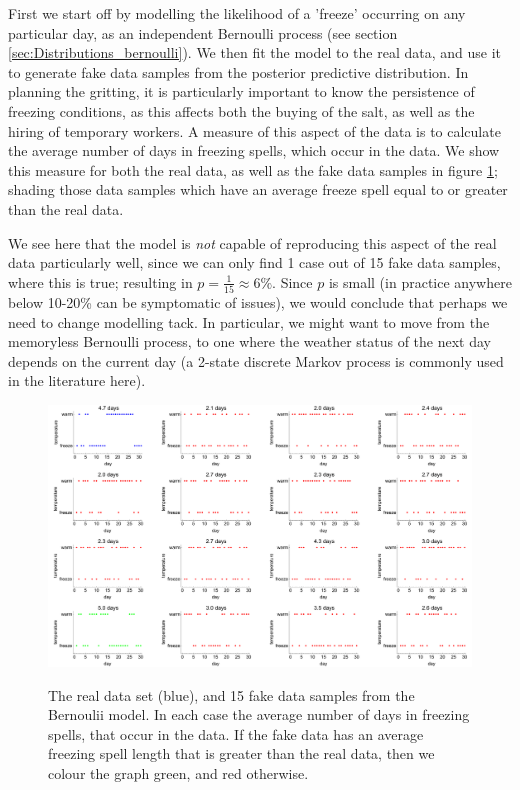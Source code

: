 \documentclass[11pt,fullpage]{book}
\begin{document}
First we start off by modelling the likelihood of a 'freeze' occurring on any particular day, as an independent Bernoulli process (see section \ref{sec:Distributions_bernoulli}). We then fit the model to the real data, and use it to generate fake data samples from the posterior predictive distribution. In planning the gritting, it is particularly important to know the persistence of freezing conditions, as this affects both the buying of the salt, as well as the hiring of temporary workers. A measure of this aspect of the data is to calculate the average number of days in freezing spells, which occur in the data. We show this measure for both the real data, as well as the fake data samples in figure \ref{fig:Evaluation_snowDays}; shading those data samples which have an average freeze spell equal to or greater than the real data. 

We see here that the model is \textit{not} capable of reproducing this aspect of the real data particularly well, since we can only find 1 case out of 15 fake data samples, where this is true; resulting in $p=\frac{1}{15}\approx 6\%$. Since $p$ is small (in practice anywhere below 10-20\% can be symptomatic of issues), we would conclude that perhaps we need to change modelling tack. In particular, we might want to move from the memoryless Bernoulli process, to one where the weather status of the next day depends on the current day (a 2-state discrete Markov process is commonly used in the literature here). 

\begin{figure}
\centering
\scalebox{0.25} 
{\includegraphics{Evaluation_snowDays.pdf}}
\caption{The real data set (blue), and 15 fake data samples from the Bernoulii model. In each case the average number of days in freezing spells, that occur in the data. If the fake data has an average freezing spell length that is greater than the real data, then we colour the graph green, and red otherwise.}\label{fig:Evaluation_snowDays}
\end{figure}
\end{document}
